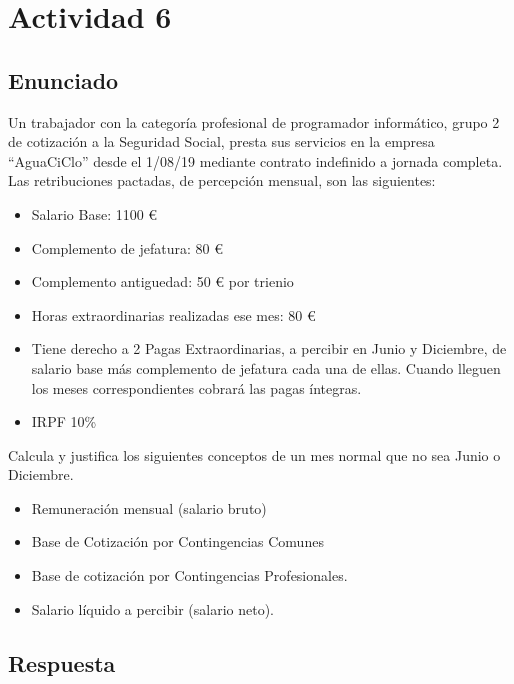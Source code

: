 \section{Actividad 6}
\subsection{Enunciado}
Un trabajador con la categoría profesional de programador informático, grupo 2 de cotización a la Seguridad Social, presta sus servicios en la empresa ``AguaCiClo'' desde el 1/08/19 mediante contrato indefinido a jornada completa. Las retribuciones pactadas, de percepción mensual, son las siguientes:
\begin{itemize}
    \item Salario Base: 1100 €
    \item Complemento de jefatura: 80 €
    \item Complemento antiguedad: 50 € por trienio
    \item Horas extraordinarias realizadas ese mes: 80 €
    \item Tiene derecho a 2 Pagas Extraordinarias, a percibir en Junio y Diciembre, de salario base más complemento de jefatura cada una de ellas. Cuando lleguen los meses correspondientes cobrará las pagas íntegras.
    \item IRPF 10\%
\end{itemize}

Calcula y justifica los siguientes conceptos de un mes normal que no sea Junio o Diciembre.

\begin{itemize}
    \item Remuneración mensual (salario bruto)
    \item Base de Cotización por Contingencias Comunes
    \item Base de cotización por Contingencias Profesionales.
    \item Salario líquido a percibir (salario neto).
\end{itemize}

\subsection{Respuesta}

